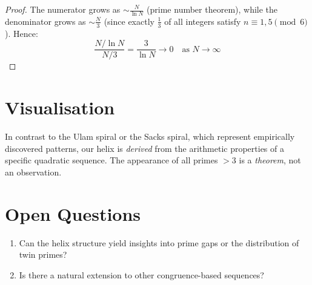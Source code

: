 \begin{proof}
The numerator grows as $\sim \frac{N}{\ln N}$ (prime number theorem),
while the denominator grows as $\sim \frac{N}{3}$ (since exactly
$\frac{1}{3}$ of all integers satisfy $n \equiv 1, 5 \pmod{6}$). Hence:
\[
\frac{N/\ln N}{N/3} = \frac{3}{\ln N} \to 0 \quad\text{as } N \to \infty
\]
\end{proof}

\section{Visualisation}

\begin{remark}\label{rem:comparison-prime-spirals}
In contrast to the Ulam spiral or the Sacks spiral, which represent
empirically discovered patterns, our helix is \emph{derived} from the
arithmetic properties of a specific quadratic sequence. The appearance
of all primes $> 3$ is a \emph{theorem}, not an observation.
\end{remark}

\section{Open Questions}

\begin{enumerate}
\item Can the helix structure yield insights into prime gaps or the
  distribution of twin primes?
\item Is there a natural extension to other congruence-based sequences?
\end{enumerate}
